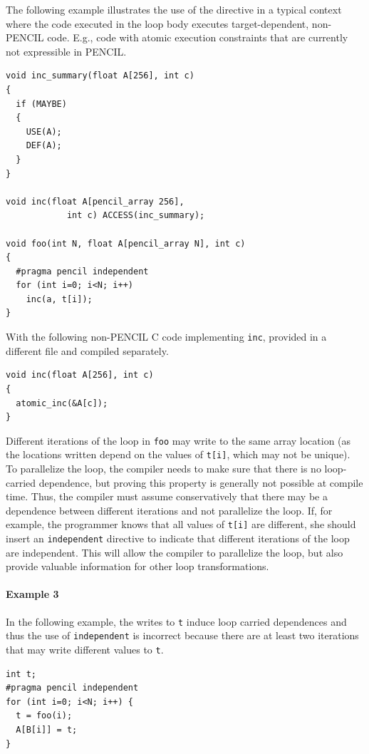  The following example illustrates the use of the directive in a
  typical context where the code executed in the loop body executes
  target-dependent, non-PENCIL code. E.g., code with atomic execution
  constraints that are currently not expressible in PENCIL.
  \begin{lstlisting}[language=pencil]
void inc_summary(float A[256], int c)
{
  if (MAYBE)
  {
    USE(A);
    DEF(A);
  }
}

void inc(float A[pencil_array 256],
            int c) ACCESS(inc_summary);

void foo(int N, float A[pencil_array N], int c)
{
  #pragma pencil independent
  for (int i=0; i<N; i++)
    inc(a, t[i]);
}  
  \end{lstlisting}

  With the following non-PENCIL C code implementing \lstinline!inc!,
  provided in a different file and compiled separately.
  \begin{lstlisting}[language=pencil]
void inc(float A[256], int c)
{
  atomic_inc(&A[c]);
}
  \end{lstlisting}

  Different iterations of the loop in \lstinline!foo! may write to the
  same array location (as the locations written depend on the values of
  \lstinline!t[i]!, which may not be unique).
  To parallelize the loop, the compiler
  needs to make sure that there is no loop-carried dependence, but
  proving this property is generally not possible at compile time.  Thus, the
  compiler must assume conservatively that there may be a dependence
  between different iterations and not parallelize the loop.
  If, for example, the \pencil programmer knows that all values of
  \lstinline!t[i]! are different, she
  should insert an \lstinline!independent! directive to indicate that different
  iterations of the loop are independent. This will allow the compiler to
  parallelize the loop, but also provide valuable
  information for other loop transformations.

\paragraph{Example 3}
  In the following example, the writes to \lstinline!t! induce loop carried
  dependences and thus the use of \lstinline!independent! is incorrect because
  there are at least two iterations that may write different values to
  \lstinline!t!.

  \begin{lstlisting}[language=pencil]
int t;
#pragma pencil independent
for (int i=0; i<N; i++) {
  t = foo(i);
  A[B[i]] = t;
}
  \end{lstlisting}  
  

